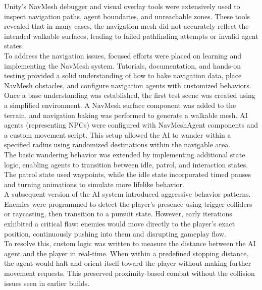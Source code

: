 \documentclass{article}
\begin{document}
Unity's NavMesh debugger and visual overlay tools were extensively used to inspect navigation paths, agent boundaries, and unreachable zones. These tools revealed that in many cases, the navigation mesh did not accurately reflect the intended walkable surfaces, leading to failed pathfinding attempts or invalid agent states.\\

To address the navigation issues, focused efforts were placed on learning and implementing the NavMesh system. Tutorials, documentation, and hands-on testing provided a solid understanding of how to bake navigation data, place NavMesh obstacles, and configure navigation agents with customized behaviors.\\

Once a base understanding was established, the first test scene was created using a simplified environment. A NavMesh surface component was added to the terrain, and navigation baking was performed to generate a walkable mesh. AI agents (representing NPCs) were configured with NavMeshAgent components and a custom movement script. This setup allowed the AI to wander within a specified radius using randomized destinations within the navigable area.\\

The basic wandering behavior was extended by implementing additional state logic, enabling agents to transition between idle, patrol, and interaction states. The patrol state used waypoints, while the idle state incorporated timed pauses and turning animations to simulate more lifelike behavior.\\

A subsequent version of the AI system introduced aggressive behavior patterns. Enemies were programmed to detect the player's presence using trigger colliders or raycasting, then transition to a pursuit state. However, early iterations exhibited a critical flaw: enemies would move directly to the player's exact position, continuously pushing into them and disrupting gameplay flow.\\

To resolve this, custom logic was written to measure the distance between the AI agent and the player in real-time. When within a predefined stopping distance, the agent would halt and orient itself toward the player without making further movement requests. This preserved proximity-based combat without the collision issues seen in earlier builds.\\
\end{document}
